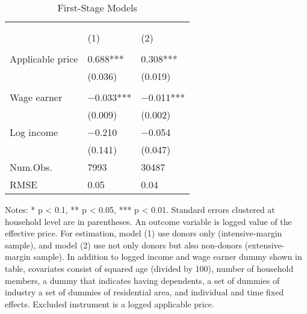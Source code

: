 \begin{table}

\caption{First-Stage Models\label{tab:main-stage1}}
\centering
\fontsize{8}{10}\selectfont
\begin{threeparttable}
\begin{tabular}[t]{l>{\centering\arraybackslash}p{18.75em}>{\centering\arraybackslash}p{18.75em}}
\toprule
\multicolumn{1}{c}{ } & \multicolumn{2}{c}{Effective price} \\
\cmidrule(l{3pt}r{3pt}){2-3}
\multicolumn{1}{c}{ } & \multicolumn{1}{c}{Donors (Intensive-margin)} & \multicolumn{1}{c}{Donors and Non-donors (Extensive-margin)} \\
\cmidrule(l{3pt}r{3pt}){2-2} \cmidrule(l{3pt}r{3pt}){3-3}
  & (1) & (2)\\
\midrule
\addlinespace[0.3em]
\multicolumn{3}{l}{\textit{Excluded instruments}}\\
\hspace{1em}Applicable price & \num{0.688}*** & \num{0.308}***\\
\hspace{1em} & (\num{0.036}) & (\num{0.019})\\
\addlinespace[0.3em]
\multicolumn{3}{l}{\textit{Covariates}}\\
\hspace{1em}Wage earner & \num{-0.033}*** & \num{-0.011}***\\
\hspace{1em} & (\num{0.009}) & (\num{0.002})\\
\hspace{1em}Log income & \num{-0.210} & \num{-0.054}\\
\hspace{1em} & (\num{0.141}) & (\num{0.047})\\
\midrule
Num.Obs. & \num{7993} & \num{30487}\\
RMSE & \num{0.05} & \num{0.04}\\
\bottomrule
\end{tabular}
\begin{tablenotes}
\item Notes: * p < 0.1, ** p < 0.05, *** p < 0.01. Standard errors clustered at household level are in parentheses. An outcome variable is logged value of the effective price. For estimation, model (1) use donors only (intensive-margin sample), and model (2) use not only donors but also non-donors (extensive-margin sample). In addition to logged income and wage earner dummy shown in table, covariates consist of squared age (divided by 100), number of household members, a dummy that indicates having dependents, a set of dummies of industry a set of dummies of residential area, and individual and time fixed effects. Excluded instrument is a logged applicable price.
\end{tablenotes}
\end{threeparttable}
\end{table}
